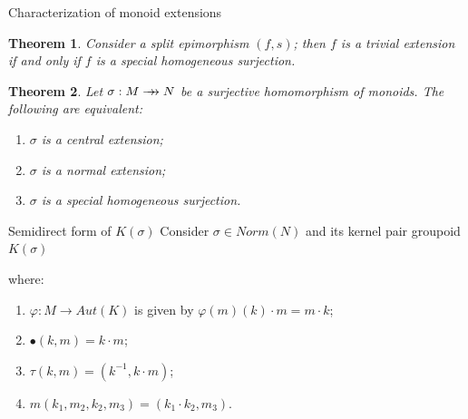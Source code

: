\documentclass[4pt]{beamer}
\newtheorem{teo}{Theorem}[section]
\newcommand{\rrightarrow}{\mathrel{\mathrlap{\rightarrow}\mkern1mu\rightarrow}}
\begin{document}
\begin{frame}{Characterization of monoid extensions}
    \begin{teo}
        Consider a split epimorphism $(f,s)$; then $f$ is a trivial extension if and only if $f$ is a special homogeneous surjection.
    \end{teo}

    \pause \vspace{5mm}

    \begin{teo}
        Let $\sigma:M\rrightarrow N$ be a surjective homomorphism of monoids. The following are equivalent:
        \begin{enumerate}
            \item $\sigma$ is a central extension;
            \item $\sigma$ is a normal extension;
            \item $\sigma$ is a special homogeneous surjection.
        \end{enumerate}
    \end{teo}
\end{frame}

\begin{frame}{Semidirect form of $K(\sigma)$}   
    Consider $\sigma\in Norm(N)$ and its kernel pair groupoid $K(\sigma)$
    
    \begin{center}
    \end{center}

    where:

    \vspace{1mm}
    
    \begin{enumerate}
        \item $\varphi:M\to Aut(K)$ is given by $\varphi(m)(k) \cdot m = m \cdot k$;
        \item $\bullet(k,m)=k\cdot m$;
        \item $\tau(k,m)=(k^{-1}, k\cdot m)$;
        \item $m(k_1,m_2,k_2,m_3) = (k_1\cdot k_2, m_3)$.
    \end{enumerate}
\end{frame}
\end{document}

